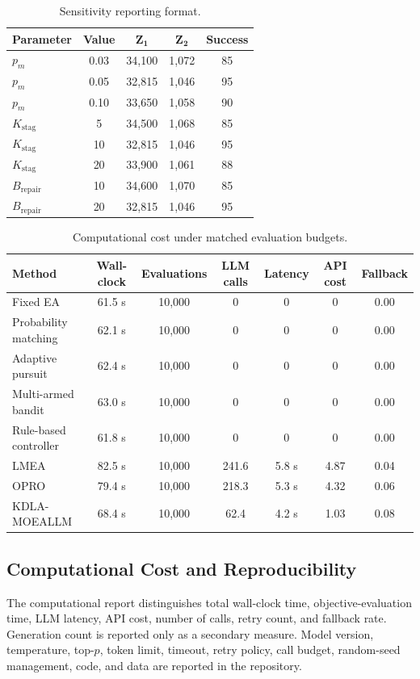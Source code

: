 \documentclass[11pt]{article}
\begin{document}
\begin{table}[!htbp]
	\centering
	\small
	\caption{Sensitivity reporting format.\label{AppTab:sensitivity}}
	\begin{tabular}{lcccc}
		\toprule
		\textbf{Parameter} & \textbf{Value} & $\boldsymbol{Z_1}$ & $\boldsymbol{Z_2}$ & \textbf{Success} \\
		\midrule
		$p_m$ & 0.03 & 34{,}100 & 1{,}072 & 85 \\
		$p_m$ & 0.05 & 32{,}815 & 1{,}046 & 95 \\
		$p_m$ & 0.10 & 33{,}650 & 1{,}058 & 90 \\
		$K_{\mathrm{stag}}$ & 5 & 34{,}500 & 1{,}068 & 85 \\
		$K_{\mathrm{stag}}$ & 10 & 32{,}815 & 1{,}046 & 95 \\
		$K_{\mathrm{stag}}$ & 20 & 33{,}900 & 1{,}061 & 88 \\
		$B_{\mathrm{repair}}$ & 10 & 34{,}600 & 1{,}070 & 85 \\
		$B_{\mathrm{repair}}$ & 20 & 32{,}815 & 1{,}046 & 95 \\
		\bottomrule
	\end{tabular}
\end{table}

\begin{table}[!htbp]
	\centering
	\small
	\caption{Computational cost under matched evaluation budgets.\label{AppTab:cost}}
	\begin{tabular}{lcccccc}
		\toprule
		\textbf{Method} & \textbf{Wall-clock} & \textbf{Evaluations} & \textbf{LLM calls} & \textbf{Latency} & \textbf{API cost} & \textbf{Fallback} \\
		\midrule
		Fixed EA & 61.5 s & 10{,}000 & 0 & 0 & 0 & 0.00 \\
		Probability matching & 62.1 s & 10{,}000 & 0 & 0 & 0 & 0.00 \\
		Adaptive pursuit & 62.4 s & 10{,}000 & 0 & 0 & 0 & 0.00 \\
		Multi-armed bandit & 63.0 s & 10{,}000 & 0 & 0 & 0 & 0.00 \\
		Rule-based controller & 61.8 s & 10{,}000 & 0 & 0 & 0 & 0.00 \\
		LMEA & 82.5 s & 10{,}000 & 241.6 & 5.8 s & 4.87 & 0.04 \\
		OPRO & 79.4 s & 10{,}000 & 218.3 & 5.3 s & 4.32 & 0.06 \\
		KDLA-MOEALLM & 68.4 s & 10{,}000 & 62.4 & 4.2 s & 1.03 & 0.08 \\
		\bottomrule
	\end{tabular}
\end{table}


\subsection{Computational Cost and Reproducibility}
\label{App:CostReproducibility}

The computational report distinguishes total wall-clock time, objective-evaluation time, LLM latency, API cost, number of calls, retry count, and fallback rate. Generation count is reported only as a secondary measure. Model version, temperature, top-$p$, token limit, timeout, retry policy, call budget, random-seed management, code, and data are reported in the repository.
\end{document}
